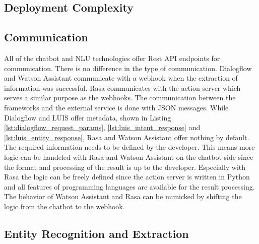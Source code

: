 \subsection*{Deployment Complexity}


\subsection*{Communication}
All of the chatbot and NLU technologies offer Rest API endpoints for communication.
There is no difference in the type of communication.
Dialogflow and Watson Assistant communicate with a webhook when the extraction 
of information was successful.
Rasa communicates with the action server which serves a similar purpose as the webhooks.
The communication between the frameworks and the external service is done with 
JSON messages.
While Dialogflow and LUIS offer metadata, shown in Listing \ref{lst:dialogflow_request_params}, \ref{lst:luis_intent_response}
and \ref{lst:luis_entity_response}, Rasa and Watson Assistant offer nothing by default.
The required information needs to be defined by the developer.
This means more logic can be handeled with Rasa and Watson Assistant on the chatbot side since the 
format and processing of the result is up to the developer.
Especially with Rasa the logic can be freely defined since the action server is written in Python and 
all features of programming languages are available for the result processing.
The behavior of Watson Assistant and Rasa can be mimicked by shifting the logic from the chatbot to the webhook.

\subsection*{Entity Recognition and Extraction}

